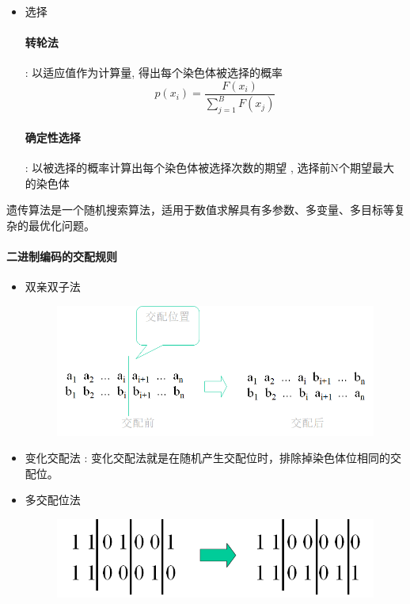 \documentclass[UTF8,a4paper]{ctexart}
\begin{document}
\begin{itemize}
	\item 选择
	      \paragraph{转轮法} : 以适应值作为计算量, 得出每个染色体被选择的概率
	      \[p(x_i) = \frac{F(x_i)}{\displaystyle{\sum_{j = 1}^B F(x_j)} }\]
	      \paragraph{确定性选择} : 以被选择的概率计算出每个染色体被选择次数的期望 , 选择前N个期望最大的染色体
\end{itemize}

遗传算法是一个随机搜索算法，适用于数值求解具有多参数、多变量、多目标等复杂的最优化问题。

\paragraph{二进制编码的交配规则 }
\begin{itemize}
	\item 双亲双子法
	      \begin{figure}[H]
		      \centering
		      \includegraphics[scale = 0.5]{assets/ArtificialIntelligence/2018-01-09-14-33-35.png}
	      \end{figure}
	\item 变化交配法 :
	      变化交配法就是在随机产生交配位时，排除掉染色体位相同的交配位。
	\item 多交配位法
	      \begin{figure}[H]
		      \centering
		      \includegraphics[scale = 0.3]{assets/ArtificialIntelligence/2018-01-09-14-36-19.png}
	      \end{figure}

\end{itemize}
\end{document}
